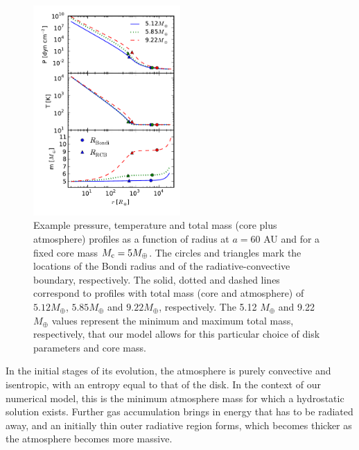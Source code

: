 \documentclass[apj]{emulateapj}
\begin{document}
\begin{figure}[h]
\centering
\includegraphics[width=0.5\textwidth]{../../figs/ModelAtmospheres/RadSelfGravPoly/PaperFigs/PTm_profiles_v2.pdf}
\caption{Example pressure, temperature and total mass (core plus atmosphere) profiles as a function of radius at $a=60$ AU and for a fixed core mass $M_{\rm c}=5 M_{\oplus}$. The circles and triangles mark the locations of the Bondi radius and of the radiative-convective boundary, respectively. The solid, dotted and dashed lines correspond to profiles with total mass (core and atmosphere) of $5.12 M_{\oplus}$, $5.85 M_{\oplus}$ and $9.22 M_{\oplus}$, respectively. The 5.12 $M_{\oplus}$ and 9.22 $M_{\oplus}$ values represent the minimum and maximum total mass, respectively, that our model allows for this particular choice of disk parameters and core mass.}
\label{fig:profiles}
\end{figure}


In the initial stages of its evolution, the atmosphere is purely convective and isentropic, with an entropy equal to that of the disk. In the context of our numerical model, this is the minimum atmosphere mass for which a hydrostatic solution exists. Further gas accumulation brings in energy that has to be radiated away, and an initially thin outer radiative region forms, which becomes thicker as the atmosphere becomes more massive. 

\end{document}
